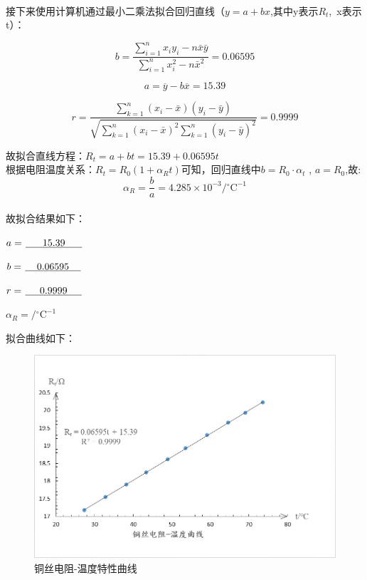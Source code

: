 \documentclass[UTF8]{ctexart}
\begin{document}
\\
接下来使用计算机通过最小二乘法拟合回归直线（$y=a+bx$,其中y表示$R_t$,~x表示t）：

$$
b=\frac{\sum_{i=1}^{n} x_{i} y_{i}-n \bar{x} \bar{y}}{\sum_{i=1}^{n} x_{i}^{2}-n \bar{x}^{2}} =0.06595
$$


$$
a=\overline{y}-b\overline{x} = 15.39
$$

$$
  r=\frac{\sum_{k=1}^n(x_i-\bar{x})
  (y_i-\bar{y})}
  {\sqrt{\sum_{k=1}^n(x_i-\bar{x})^2
  \sum_{k=1}^n(y_i-\bar{y})^2}}=0.9999
$$

\noindent 故拟合直线方程：$R_t=a+bt=15.39+0.06595t$
\\
根据电阻温度关系：$R_t=R_0(1+\alpha_R t )$可知，回归直线中$b=R_0\cdot\alpha_t $ , $a=R_0$,故:
$$
\alpha_R=\frac{b}{a}=4.285\times 10^{-3} /{ }^{\circ}\mathrm{C}^{-1}
$$
\\
故拟合结果如下：

$a=\dlmu[2cm]{15.39}$

$b=\dlmu[2cm]{0.06595}$

$r=\dlmu[2cm]{0.9999}$  

$\alpha_R=$$/{ }^{\circ}\mathrm{C}^{-1}$ 

拟合曲线如下：
\begin{figure}[ht]
    \centering
    \includegraphics[scale=1]{铜丝电阻温度.png}
    \caption{铜丝电阻-温度特性曲线}
    \label{fig:label}
\end{figure}
\end{document}
